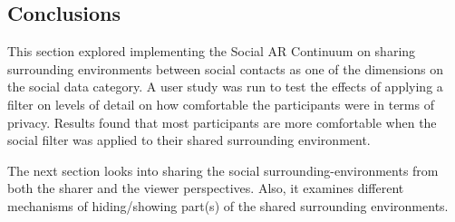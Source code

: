 \subsection{Conclusions}

This section explored implementing the Social AR Continuum on sharing surrounding environments between social contacts as one of the dimensions on the social data category. A user study was run to test the effects of applying a filter on levels of detail on how comfortable the participants were in terms of privacy. Results found that most participants are more comfortable when the social filter was applied to their shared surrounding environment.

The next section looks into sharing the social surrounding-environments from both the sharer and the viewer perspectives. Also, it examines different mechanisms of hiding/showing part(s) of the shared surrounding environments. 